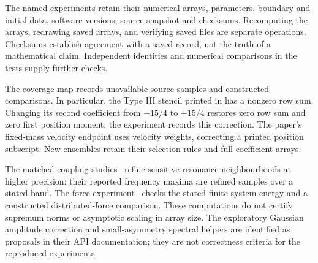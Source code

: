 \documentclass[11pt]{article}
\begin{document}
The named experiments retain their numerical arrays, parameters,
boundary and initial data, software versions, source snapshot and
checksums. Recomputing the arrays, redrawing saved arrays, and verifying
saved files are separate operations.
Checksums establish agreement with a saved record, not the truth of
a mathematical claim. Independent identities and numerical comparisons
in the tests supply further checks.

The coverage map records unavailable source samples and constructed
comparisons. In particular, the Type III stencil printed in
\cite[Figure 7]{nnn} has a nonzero row sum.
Changing its second coefficient from $-15/4$ to $+15/4$ restores
zero row sum and zero first position moment; the experiment records this
correction. The paper's fixed-mass velocity endpoint uses velocity
weights, correcting a printed position subscript.
New ensembles retain their selection rules and full coefficient arrays.

The matched-coupling studies~\cite{asymmetric,symmetry} refine
sensitive resonance neighbourhoods at higher precision; their reported
frequency maxima are refined samples over a stated band.
The force experiment~\cite{energy} checks the stated finite-system
energy and a constructed distributed-force comparison.
These computations do not certify supremum norms or asymptotic
scaling in array size.
The exploratory Gaussian amplitude correction and small-asymmetry
spectral helpers are identified as proposals in their API documentation;
they are not correctness criteria for the reproduced experiments.
\end{document}
